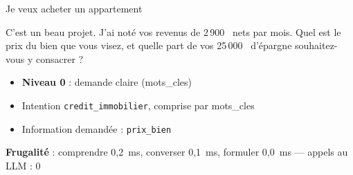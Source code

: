 \documentclass[11pt,a4paper]{article}
\newcommand{\frugal}[1]{{\scriptsize\color{darkgray}\textbf{Frugalité} : #1}\par\medskip}
\begin{document}
\begin{client}Je veux acheter un appartement\end{client}
\begin{assistant}C'est un beau projet. J'ai noté vos revenus de 2\,900~\texteuro{} nets par mois. Quel est le prix du bien que vous visez, et quelle part de vos 25\,000~\texteuro{} d'épargne souhaitez-vous y consacrer ?\end{assistant}
\begin{pourquoi}
\begin{itemize}
\item \textbf{Niveau 0} : demande claire (mots\_cles)
\item Intention \texttt{credit\_immobilier}, comprise par mots\_cles
\item Information demandée : \texttt{prix\_bien}
\end{itemize}
\end{pourquoi}
\frugal{comprendre 0,2~ms, converser 0,1~ms, formuler 0,0~ms --- appels au LLM : 0}
\end{document}
